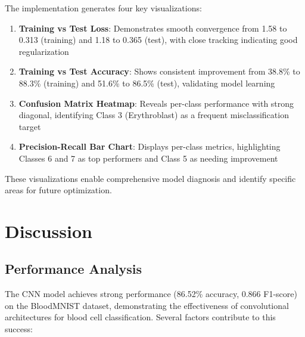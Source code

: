\documentclass[runningheads]{llncs}
\begin{document}
The implementation generates four key visualizations:

\begin{enumerate}
    \item \textbf{Training vs Test Loss}: Demonstrates smooth convergence from 1.58 to 0.313 (training) and 1.18 to 0.365 (test), with close tracking indicating good regularization
    
    \item \textbf{Training vs Test Accuracy}: Shows consistent improvement from 38.8\% to 88.3\% (training) and 51.6\% to 86.5\% (test), validating model learning
    
    \item \textbf{Confusion Matrix Heatmap}: Reveals per-class performance with strong diagonal, identifying Class 3 (Erythroblast) as a frequent misclassification target
    
    \item \textbf{Precision-Recall Bar Chart}: Displays per-class metrics, highlighting Classes 6 and 7 as top performers and Class 5 as needing improvement
\end{enumerate}

These visualizations enable comprehensive model diagnosis and identify specific areas for future optimization.

\section{Discussion}

\subsection{Performance Analysis}

The CNN model achieves strong performance (86.52\% accuracy, 0.866 F1-score) on the BloodMNIST dataset, demonstrating the effectiveness of convolutional architectures for blood cell classification. Several factors contribute to this success:
\end{document}
